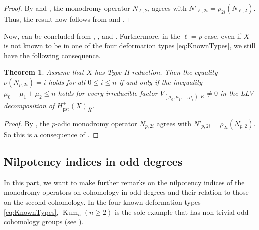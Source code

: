 \documentclass[12pt,reqno]{amsart}
\newtheorem{thm}{Theorem}[section]
\theoremstyle{definition}
\newcommand\Kum{\mathop{\mathrm{Kum}}\nolimits}
\DeclareMathOperator{\pst}{pst}
\numberwithin{equation}{section}
\begin{document}
\begin{proof}
   By  and  , the monodromy operator $N_{\ell, 2i}$ agrees with $N'_{\ell, 2i}=\rho_{2i}(N_{\ell, 2})$. Thus, the result now follows from  and .
\end{proof}

Now,  can be concluded from , , and . Furthermore, in the $\ell=p$ case, even if $X$ is not known to be in one of the four deformation types \eqref{eq:KnownTypes}, we still have the following consequence.

\begin{thm}
\label{thm:nagai for type II and general case}
Assume that $X$ has Type II reduction.
Then the equality $\nu (N_{p,2i}) = i$ holds for all $0 \leq i \leq n$ if and only if the inequality $\mu_0 + \mu_1 + \mu_2 \leq n$ holds for every irreducible factor $V_{(\mu_0, \mu_1, \dotsc, \mu_r), \overline{K}} \neq 0$ in the LLV decomposition of $H^+_{\pst}(X)_{\overline{K}}$.
\end{thm}

\begin{proof}
    By , the $p$-adic monodromy operator $N_{p, 2i}$ agrees with $N'_{p, 2i}=\rho_{2i}(N_{p, 2})$.
    So this is a consequence of .
\end{proof}


















\subsection{Nilpotency indices in odd degrees}\label{subsec:Nilpotency indices in odd degrees}

In this part, we want to make further remarks on the nilpotency indices of the monodromy operators on cohomology in odd degrees and their relation to those on the second cohomology.
In the four known deformation types \eqref{eq:KnownTypes},  $\Kum_n(n \geq2)$ is the sole example that has non-trivial odd cohomology groups (see ).
\end{document}
